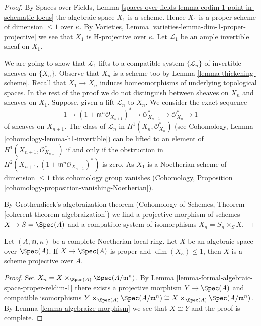 \begin{proof}
By Spaces over Fields, Lemma
\ref{spaces-over-fields-lemma-codim-1-point-in-schematic-locus}
the algebraic space $X_1$ is a scheme. Hence $X_1$
is a proper scheme of dimension $\leq 1$ over $\kappa$.
By Varieties, Lemma \ref{varieties-lemma-dim-1-proper-projective}
we see that $X_1$ is H-projective over $\kappa$.
Let $\mathcal{L}_1$ be an ample invertible sheaf on $X_1$.

\medskip\noindent
We are going to show that $\mathcal{L}_1$ lifts to a compatible system
$\{\mathcal{L}_n\}$ of invertible sheaves on $\{X_n\}$.
Observe that $X_n$ is a scheme too by Lemma \ref{lemma-thickening-scheme}.
Recall that $X_1 \to X_n$ induces homeomorphisms of underlying
topological spaces. In the rest of the proof we do not distinguish
between sheaves on $X_n$ and sheaves on $X_1$.
Suppose, given a lift $\mathcal{L}_n$ to $X_n$. We consider
the exact sequence
$$
1 \to
(1 + \mathfrak m^n\mathcal{O}_{X_{n + 1}})^* \to
\mathcal{O}_{X_{n + 1}}^* \to \mathcal{O}_{X_n}^* \to 1
$$
of sheaves on $X_{n + 1}$. The class of $\mathcal{L}_n$ in
$H^1(X_n, \mathcal{O}_{X_n}^*)$ (see
Cohomology, Lemma \ref{cohomology-lemma-h1-invertible})
can be lifted to an element of $H^1(X_{n + 1}, \mathcal{O}_{X_{n + 1}}^*)$
if and only if the obstruction in
$H^2(X_{n + 1}, (1 + \mathfrak m^n\mathcal{O}_{X_{n + 1}})^*)$
is zero. As $X_1$ is a Noetherian scheme of dimension $\leq 1$
this cohomology group vanishes (Cohomology, Proposition
\ref{cohomology-proposition-vanishing-Noetherian}).

\medskip\noindent
By Grothendieck's algebraization theorem
(Cohomology of Schemes, Theorem \ref{coherent-theorem-algebraization})
we find a projective morphism of schemes $X \to S = \Spec(A)$
and a compatible system of isomorphisms $X_n = S_n \times_S X$.
\end{proof}

\begin{lemma}
\label{lemma-projective-over-complete}
Let $(A, \mathfrak m, \kappa)$ be a complete Noetherian local ring.
Let $X$ be an algebraic space over $\Spec(A)$.
If $X \to \Spec(A)$ is proper and $\dim(X_\kappa) \leq 1$, then
$X$ is a scheme projective over $A$.
\end{lemma}

\begin{proof}
Set $X_n = X \times_{\Spec(A)} \Spec(A/\mathfrak m^n)$.
By Lemma \ref{lemma-formal-algebraic-space-proper-reldim-1}
there exists a projective morphism $Y \to \Spec(A)$
and compatible isomorphisms
$Y \times_{\Spec(A)} \Spec(A/\mathfrak m^n) \cong
X \times_{\Spec(A)} \Spec(A/\mathfrak m^n)$.
By Lemma \ref{lemma-algebraize-morphism}
we see that $X \cong Y$ and the proof is complete.
\end{proof}










